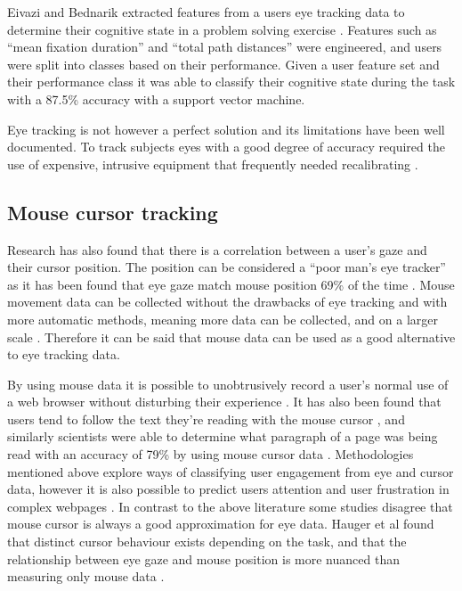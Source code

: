 \documentclass{article}
\begin{document}
Eivazi and Bednarik extracted features from a users eye tracking data to determine their cognitive state in a problem solving exercise \cite{eivazi2011predicting}.
Features such as ``mean fixation duration'' and ``total path distances'' were engineered, and users were split into classes based on their performance. 
Given a user feature set and their performance class it was able to classify their cognitive state during the task with a 87.5\% accuracy with a support vector machine.

Eye tracking is not however a perfect solution and its limitations have been well documented. 
To track subjects eyes with a good degree of accuracy required the use of expensive, intrusive equipment that frequently needed recalibrating \cite{richardson2004eye}. 


\subsection{Mouse cursor tracking}

Research has also found that there is a correlation between a user’s gaze and their cursor position. 
The position can be considered a ``poor man’s eye tracker'' as it has been found that eye gaze match mouse position 69\% of the time \cite{cooke2006mouse}. 
Mouse movement data can be collected without the drawbacks of eye tracking and with more automatic methods, meaning more data can be collected, and on a larger scale \cite{demvsar2017quantifying}.
Therefore it can be said that mouse data can be used as a good alternative to eye tracking data.

By using mouse data it is possible to unobtrusively record a user’s normal use of a web browser without disturbing their experience \cite{goecks2000learning}.
It has also been found that users tend to follow the text they’re reading with the mouse cursor \cite{liu2007detecting}, and similarly scientists were able to determine what paragraph of a page was being read with an accuracy of 79\% by using mouse cursor data \cite{hauger2011using}. 
Methodologies mentioned above explore ways of classifying user engagement from eye and cursor data, however it is also possible to predict users attention and user frustration in complex webpages \cite{navalpakkam2012mouse}.
In contrast to the above literature some studies disagree that mouse cursor is always a good approximation for eye data. 
Hauger et al found that distinct cursor behaviour exists depending on the task, and that the relationship between eye gaze and mouse position is more nuanced than measuring only mouse data \cite{huang2012user}.
\end{document}
